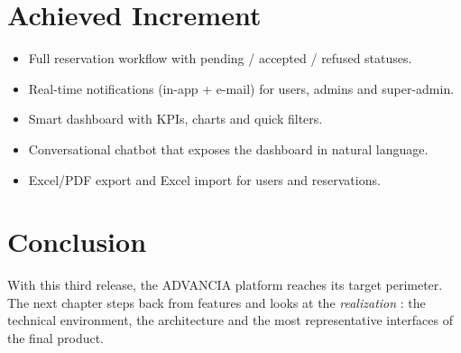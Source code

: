 \section{Achieved Increment}

\begin{itemize}[leftmargin=2em,itemsep=0.2em]
  \item Full reservation workflow with pending / accepted / refused statuses.
  \item Real-time notifications (in-app + e-mail) for users, admins and super-admin.
  \item Smart dashboard with KPIs, charts and quick filters.
  \item Conversational chatbot that exposes the dashboard in natural language.
  \item Excel/PDF export and Excel import for users and reservations.
\end{itemize}

\section{Conclusion}

With this third release, the ADVANCIA platform reaches its target perimeter. The next chapter steps back from features and looks at the \textit{realization} : the technical environment, the architecture and the most representative interfaces of the final product.
